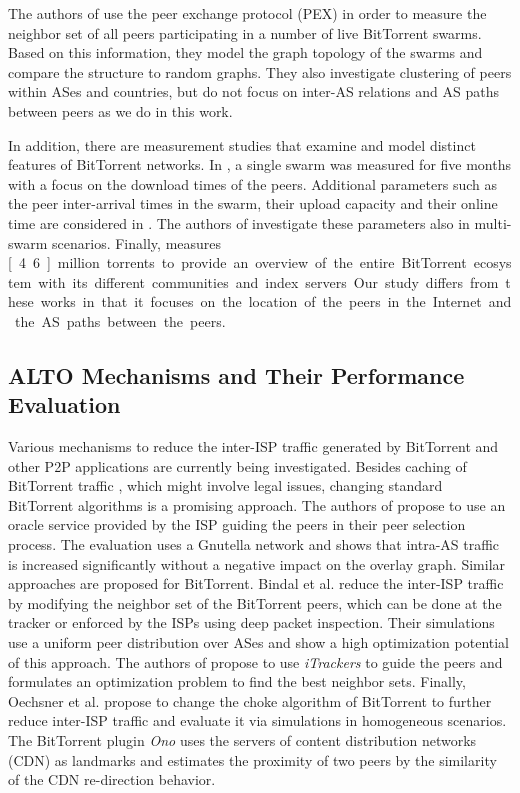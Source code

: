 The authors of \cite{Kryczka2011} use the peer exchange protocol (PEX) in order to measure the neighbor set of all peers participating in a number of live BitTorrent swarms. Based on this information, they model the graph topology of the swarms and compare the structure to random graphs. They also investigate clustering of peers within ASes and countries, but do not focus on inter-AS relations and AS paths between peers as we do in this work.

In addition, there are measurement studies that examine and model distinct features of BitTorrent networks. In \cite{Izal2004}, a single swarm was measured for five months with a focus on the download times of the peers. Additional parameters such as the peer inter-arrival times in the swarm, their upload capacity and their online time are considered in \cite{Pouwelse2005}. The authors of \cite{Guo2005} investigate these parameters also in multi-swarm scenarios. Finally, \cite{Zhang2010} measures \unit[4.6]{million} torrents to provide an overview of the entire BitTorrent ecosystem with its different communities and index servers. Our study differs from these works in that it focuses on the location of the peers in the Internet and the AS paths between the peers.

\subsection{ALTO Mechanisms and Their Performance Evaluation}

Various mechanisms to reduce the inter-ISP traffic generated by BitTorrent and other P2P applications are currently being investigated. Besides caching of BitTorrent traffic \cite{Lehrieder2010a,Lehrieder2012,Pacifici2012}, which might involve legal issues, changing standard BitTorrent algorithms is a promising approach. The authors of \cite{Aggarwal2007} propose to use an oracle service provided by the ISP guiding the peers in their peer selection process. The evaluation uses a Gnutella network and shows that intra-AS traffic is increased significantly without a negative impact on the overlay graph. Similar approaches are proposed for BitTorrent. Bindal et al. \cite{Bindal2006} reduce the inter-ISP traffic by modifying the neighbor set of the BitTorrent peers, which can be done at the tracker or enforced by the ISPs using deep packet inspection. Their simulations use a uniform peer distribution over ASes and show a high optimization potential of this approach. The authors of \cite{Xie2008} propose to use \emph{iTrackers} to guide the peers and formulates an optimization problem to find the best neighbor sets. Finally, Oechsner et al. \cite{Oechsner2009} propose to change the choke algorithm of BitTorrent to further reduce inter-ISP traffic and evaluate it via simulations in homogeneous scenarios. The BitTorrent plugin \emph{Ono} \cite{Choffnes2008} uses the servers of content distribution networks (CDN) as landmarks and estimates the proximity of two peers by the similarity of the CDN re-direction behavior.


